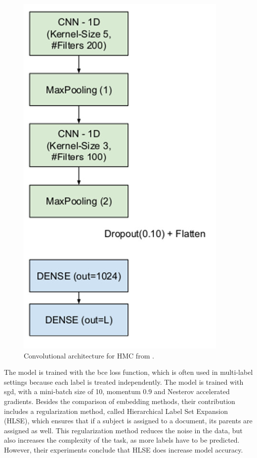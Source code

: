\begin{figure}
    \centering
    \includegraphics[width=.3\textwidth]{figures/hmc/gargiulo.png}
    \caption{Convolutional architecture for HMC from \cite{gargiulo2019deep}.}
    \label{fig:gargiulo}
\end{figure}

The model is trained with the \acrfull{bce} loss function, which is often used in multi-label settings because each label is treated independently. The model is trained with \acrfull{sgd}, with a mini-batch size of 10, momentum 0.9 and Nesterov accelerated gradients. Besides the comparison of embedding methods, their contribution includes a regularization method, called Hierarchical Label Set Expansion (HLSE), which ensures that if a subject is assigned to a document, its parents are assigned as well. This regularization method reduces the noise in the data, but also increases the complexity of the task, as more labels have to be predicted. However, their experiments conclude that HLSE does increase model accuracy.

